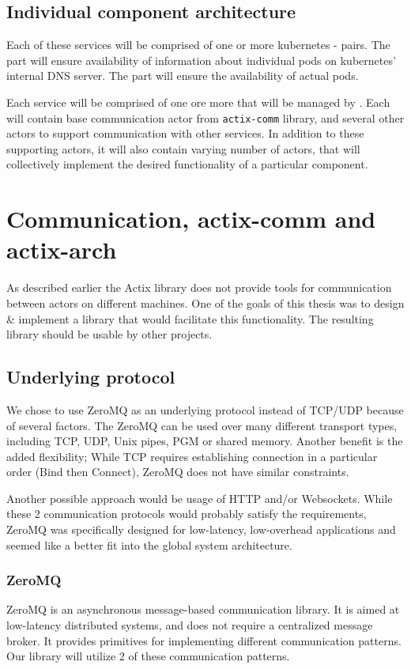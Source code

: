 \subsection{Individual component architecture}
Each of these services will be comprised of one or more kubernetes - pairs. The
 part will ensure availability of information about individual pods on kubernetes' internal DNS server.
The  part will ensure the availability of actual pods.

Each service will be comprised of one ore more  that will be managed by . Each 
will contain base communication actor from \verb|actix-comm| library, and several other actors to support communication with other services. In addition to
these supporting actors, it will also contain varying number of actors, that will collectively implement
the desired functionality of a particular component.

\section{Communication, actix-comm and actix-arch}
\label{section:actix_comm}
As described earlier the Actix library does not provide tools for communication between actors on different machines. One of the
goals of this thesis was to design \& implement a library that would facilitate this functionality. The resulting library
should be usable by other projects.

\subsection{Underlying protocol}
We chose to use ZeroMQ\cite{hintjens2011} as an underlying protocol instead of TCP/UDP because of several factors. The ZeroMQ can be used over
many different transport types, including TCP, UDP, Unix pipes, PGM or shared memory. Another benefit is the added flexibility; While
TCP requires establishing connection in a particular order (Bind then Connect), ZeroMQ does not have similar constraints.

Another possible approach would be usage of HTTP and/or Websockets. While these 2 communication protocols would probably
satisfy the requirements, ZeroMQ was specifically designed for low-latency, low-overhead applications and seemed
like a better fit into the global system architecture.

\subsubsection{ZeroMQ}
ZeroMQ is an asynchronous message-based communication library. It is aimed at low-latency distributed systems, and does not require a centralized
message broker. It provides primitives for implementing different communication patterns. Our library
will utilize 2 of these communication patterns.

